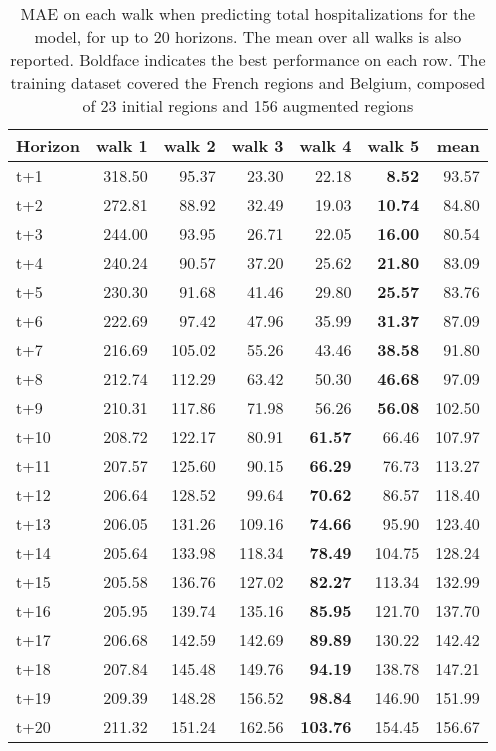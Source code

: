 \begin{table}[H]
\centering
\caption{MAE on each walk when predicting total hospitalizations for the model, for up to 20 horizons. The mean over all walks is also reported. Boldface indicates the best performance on each row. The training dataset covered the French regions and Belgium, composed of 23 initial regions and 156 augmented regions }
\label{tab:MAE_walk_encoder_decoder}
\begin{tabular}{lrrrrrr}
\toprule
Horizon &  walk 1 &  walk 2 &  walk 3 &  walk 4 &  walk 5 &   mean \\
\midrule
t+1  & 318.50  & 95.37  & 23.30  & 22.18  & \textbf{8.52}  & 93.57  \\
t+2  & 272.81  & 88.92  & 32.49  & 19.03  & \textbf{10.74}  & 84.80  \\
t+3  & 244.00  & 93.95  & 26.71  & 22.05  & \textbf{16.00}  & 80.54  \\
t+4  & 240.24  & 90.57  & 37.20  & 25.62  & \textbf{21.80}  & 83.09  \\
t+5  & 230.30  & 91.68  & 41.46  & 29.80  & \textbf{25.57}  & 83.76  \\
t+6  & 222.69  & 97.42  & 47.96  & 35.99  & \textbf{31.37}  & 87.09  \\
t+7  & 216.69  & 105.02  & 55.26  & 43.46  & \textbf{38.58}  & 91.80  \\
t+8  & 212.74  & 112.29  & 63.42  & 50.30  & \textbf{46.68}  & 97.09  \\
t+9  & 210.31  & 117.86  & 71.98  & 56.26  & \textbf{56.08}  & 102.50  \\
t+10  & 208.72  & 122.17  & 80.91  & \textbf{61.57}  & 66.46  & 107.97  \\
t+11  & 207.57  & 125.60  & 90.15  & \textbf{66.29}  & 76.73  & 113.27  \\
t+12  & 206.64  & 128.52  & 99.64  & \textbf{70.62}  & 86.57  & 118.40  \\
t+13  & 206.05  & 131.26  & 109.16  & \textbf{74.66}  & 95.90  & 123.40  \\
t+14  & 205.64  & 133.98  & 118.34  & \textbf{78.49}  & 104.75  & 128.24  \\
t+15  & 205.58  & 136.76  & 127.02  & \textbf{82.27}  & 113.34  & 132.99  \\
t+16  & 205.95  & 139.74  & 135.16  & \textbf{85.95}  & 121.70  & 137.70  \\
t+17  & 206.68  & 142.59  & 142.69  & \textbf{89.89}  & 130.22  & 142.42  \\
t+18  & 207.84  & 145.48  & 149.76  & \textbf{94.19}  & 138.78  & 147.21  \\
t+19  & 209.39  & 148.28  & 156.52  & \textbf{98.84}  & 146.90  & 151.99  \\
t+20  & 211.32  & 151.24  & 162.56  & \textbf{103.76}  & 154.45  & 156.67  \\

\bottomrule
\end{tabular}
\end{table}
